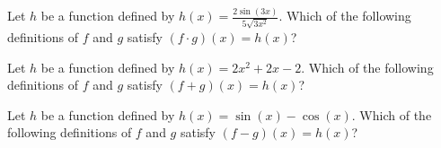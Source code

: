 \documentclass{ximera}
\author{Kenneth Berglund}
\begin{document}
\begin{exercise}
 Let $h$ be a function defined by $h(x) = \frac{2\sin(3x)}{5\sqrt{3x^2}}$. Which of the following definitions of $f$ and $g$ satisfy $(f \cdot g)(x) = h(x)$?
\begin{multipleChoice}
\end{multipleChoice}

 Let $h$ be a function defined by $h(x) = 2x^2 + 2x - 2$. Which of the following definitions of $f$ and $g$ satisfy $(f + g)(x) = h(x)$?
\begin{multipleChoice}
\end{multipleChoice}

 Let $h$ be a function defined by $h(x) = \sin(x) - \cos(x)$. Which of the following definitions of $f$ and $g$ satisfy $(f - g)(x) = h(x)$?
\begin{multipleChoice}
\end{multipleChoice}

\end{exercise}
\end{document}
